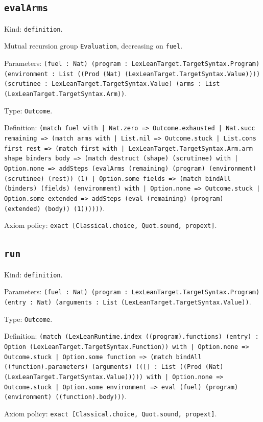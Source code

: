 \documentclass[11pt]{article}
\begin{document}
\subsection*{\texttt{evalArms}}
\noindent Kind: \texttt{definition}.\par
\noindent Mutual recursion group \texttt{Evaluation}, decreasing on \texttt{fuel}.\par
\noindent Parameters: \texttt{(fuel : Nat) (program : LexLeanTarget.TargetSyntax.Program) (environment : List ((Prod (Nat) (LexLeanTarget.TargetSyntax.Value)))) (scrutinee : LexLeanTarget.TargetSyntax.Value) (arms : List (LexLeanTarget.TargetSyntax.Arm))}.\par
\noindent Type: \texttt{Outcome}.\par
\noindent Definition: \texttt{(match fuel with | Nat.zero => Outcome.exhausted | Nat.succ remaining => (match arms with | List.nil => Outcome.stuck | List.cons first rest => (match first with | LexLeanTarget.TargetSyntax.Arm.arm shape binders body => (match destruct (shape) (scrutinee) with | Option.none => addSteps (evalArms (remaining) (program) (environment) (scrutinee) (rest)) (1) | Option.some fields => (match bindAll (binders) (fields) (environment) with | Option.none => Outcome.stuck | Option.some extended => addSteps (eval (remaining) (program) (extended) (body)) (1))))))}.\par
\noindent Axiom policy: \texttt{exact [Classical.choice, Quot.sound, propext]}.\par
\subsection*{\texttt{run}}
\noindent Kind: \texttt{definition}.\par
\noindent Parameters: \texttt{(fuel : Nat) (program : LexLeanTarget.TargetSyntax.Program) (entry : Nat) (arguments : List (LexLeanTarget.TargetSyntax.Value))}.\par
\noindent Type: \texttt{Outcome}.\par
\noindent Definition: \texttt{(match (LexLeanRuntime.index ((program).functions) (entry) : Option (LexLeanTarget.TargetSyntax.Function)) with | Option.none => Outcome.stuck | Option.some function => (match bindAll ((function).parameters) (arguments) (([] : List ((Prod (Nat) (LexLeanTarget.TargetSyntax.Value))))) with | Option.none => Outcome.stuck | Option.some environment => eval (fuel) (program) (environment) ((function).body)))}.\par
\noindent Axiom policy: \texttt{exact [Classical.choice, Quot.sound, propext]}.\par
\end{document}
